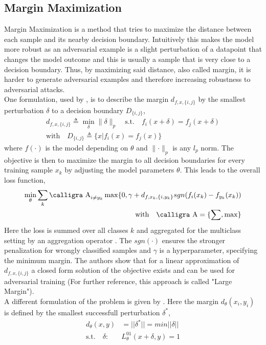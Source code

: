 \documentclass[conference]{IEEEtran}
\begin{document}
\subsection{Margin Maximization}
Margin Maximization is a method that tries to maximize the distance between each sample and its nearby decision boundary. Intuitively this makes the model more robust as an adversarial example is a slight perturbation of a datapoint that changes the model outcome and this is usually a sample that is very close to a decision boundary. Thus, by maximizing said distance, also called margin, it is harder to generate adversarial examples and therefore increasing robustness to adversarial attacks. \\
One formulation, used by \cite{b15}, is to describe the margin $d_{f,x,\{i,j\}}$ by the smallest perturbation $\delta$ to a decision boundary $D_{\{i,j\}}$,
\begin{align*}
  d_{f,x,\{i,j\}} \triangleq \min_{\delta} \parallel \delta \parallel_p \quad \text{s.t.} \quad f_i(x+\delta) = f_j(x+\delta) \\
  \text{with} \quad D_{\{i,j\}} \triangleq \{x|f_i(x) = f_j(x)\}
\end{align*}
where $f(\cdot)$ is the model depending on $\theta$ and $\parallel \cdot \parallel_p$ is any $l_p$ norm. The objective is then to maximize the margin to all decision boundaries for every training sample $x_k$ by adjusting the model parameters $\theta$. This leads to the overall loss function,
\begin{align*}
  \min_{\theta} \sum_k \text{\calligra A}_{i \neq y_k} \max \{0, \gamma + d_{f,x_k,\{i,y_k\}} \space sgn (f_i(x_k) - f_{y_k}(x_k)) \\
  \text{with} \quad \text{\calligra A} = \{\sum, \max\}
\end{align*}
Here the loss is summed over all classes $k$ and aggregated for the multiclass setting by an aggregation operator . The $sgn(\cdot)$ ensures the stronger penalization for wrongly classified samples and $\gamma$ is a hyperparameter, specifying the minimum margin. The authors show that for a linear approximation of $d_{f,x,\{i,j\}}$ a closed form solution of the objective exists and can be used for adversarial training (For further reference, this approach is called "Large Margin"). \\
A different formulation of the problem is given by \cite{b1}. Here the margin $d_\theta(x_i, y_i)$ is defined by the smallest successfull perturbation $\delta^*$, 
\begin{align*}
  d_\theta(x,y) & = ||\delta^*|| = min ||\delta|| \\ 
  \text{s.t.} \quad \delta: & L_\theta^{01}(x+\delta, y) = 1
\end{align*}
\end{document}
